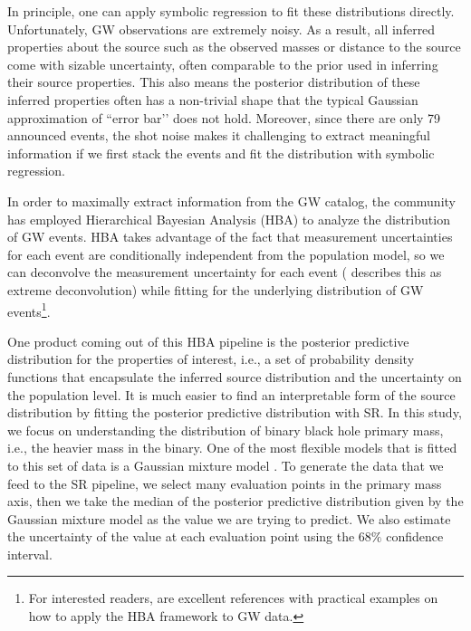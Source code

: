 \documentclass[nohyperref]{article}
\theoremstyle{plain}
\theoremstyle{definition}
\theoremstyle{remark}
\begin{document}
In principle, one can apply symbolic regression to fit these distributions directly.
Unfortunately, GW observations are extremely noisy. As a result, all inferred properties about the source such as the observed masses or distance to the source come with sizable uncertainty, often comparable to the prior used in inferring their source properties.
This also means the posterior distribution of these inferred properties often has a non-trivial shape that the typical Gaussian approximation of ``error bar’’ does not hold.
Moreover, since there are only 79 announced events, the shot noise makes it challenging to extract meaningful information if we first stack the events and fit the distribution with symbolic regression.

In order to maximally extract information from the GW catalog, the community has employed Hierarchical Bayesian Analysis (HBA) to analyze the distribution of GW events.
HBA takes advantage of the fact that measurement uncertainties for each event are conditionally independent from the population model, so we can deconvolve the measurement uncertainty for each event (\cite{10.1214/10-AOAS439} describes this as extreme deconvolution) while fitting for the underlying distribution of GW events\footnote{For interested readers, \cite{Mandel:2018mve,Vitale:2020aaz,2019MNRAS.484.4008G} are excellent references with practical examples on how to apply the HBA framework to GW data.
}.

\newcommand\ppd{posterior predictive distribution\xspace} %
\newcommand{\defineppd}{} %

One product coming out of this HBA pipeline is the posterior predictive distribution \defineppd for the properties of interest, i.e., a set of probability density functions that encapsulate the inferred source distribution and the uncertainty on the population level.
It is much easier to find an interpretable form of the source distribution by fitting the \ppd with SR.
In this study, we focus on understanding the distribution of binary black hole primary mass, i.e., the heavier mass in the binary.
One of the most flexible models that is fitted to this set of data is a Gaussian mixture model \cite{Tiwari:2020vym}.
To generate the data that we feed to the SR pipeline,
we select many evaluation points in the primary mass axis,
then we take the median of the \ppd given by the Gaussian mixture model as the value we are trying to predict.
We also estimate the uncertainty of the value at each evaluation point using the $68\%$ confidence interval.
\end{document}
